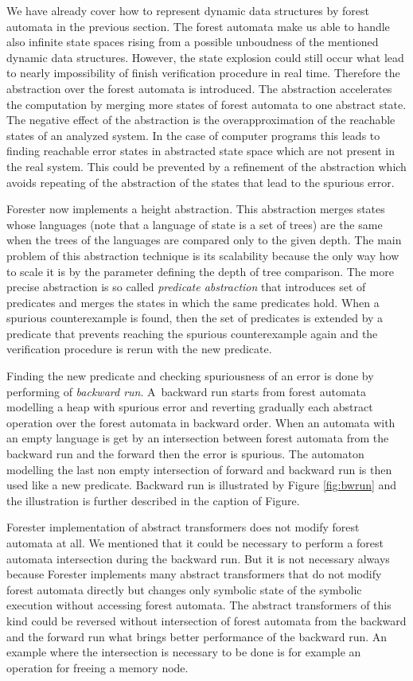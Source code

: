 \documentclass[fleqn,11pt]{ExcelAtFIT} %
\begin{document}
We have already cover how to represent dynamic data structures by forest automata in the previous section.
The forest automata make us able to handle also infinite state spaces
rising from a possible unboudness of the mentioned dynamic data structures.
However, the state explosion could still occur what lead
to nearly impossibility of finish verification procedure in real time.
Therefore the abstraction over the forest automata is introduced.
The abstraction accelerates the computation by merging more states
of forest automata to one abstract state.
The negative effect of the abstraction is the overapproximation of the reachable
states of an analyzed system.
In the case of computer programs this leads to finding reachable error states in
abstracted state space which are not present in the real system.
This could be prevented by a refinement of the abstraction
which avoids repeating of the abstraction of the states
that lead to the spurious error.

Forester now implements a height abstraction.
This abstraction merges states whose languages (note that a language of state is a set of trees) are the same
when the trees of the languages are compared only to the given depth.
The main problem of this abstraction technique is its scalability because
the only way how to scale it is by the parameter defining the depth of tree comparison.
The more precise abstraction is so called \emph{predicate abstraction} that introduces
set of predicates and merges the states in which the same predicates hold.
When a spurious counterexample is found, then the set of predicates is extended by
a predicate that prevents reaching the spurious counterexample again
and the verification procedure is rerun with the new predicate.

Finding the new predicate and checking spuriousness of an error is done by performing of \emph{backward run}.
A~backward run starts from forest automata modelling a heap with spurious error and
reverting gradually each abstract operation over the forest automata
in backward order.
When an automata with an empty language is get by an intersection between forest automata
from the backward run and the forward then the error is spurious.
The automaton modelling the last non empty intersection of forward and backward run
is then used like a new predicate.
Backward run is illustrated by Figure \ref{fig:bwrun} and the illustration
is further described in the caption of Figure.

Forester implementation of abstract transformers does not modify
forest automata at all.
We mentioned that it could be necessary to perform a forest automata intersection during
the backward run.
But it is not necessary always because Forester implements many abstract transformers
that do not modify forest automata directly but changes only symbolic state of the symbolic execution
without accessing forest automata.
The abstract transformers of this kind could be reversed without intersection of forest automata
from the backward and the forward run what brings better performance of the backward run.
An example where the intersection is necessary to be done is for example an operation for freeing a memory node.
\end{document}
